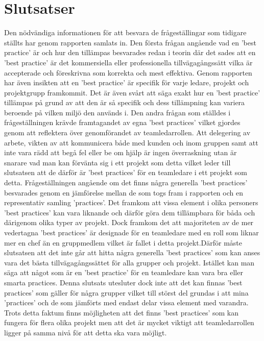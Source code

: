 \section{Slutsatser}
Den nödvändiga informationen för att besvara de frågeställingar som tidigare ställts har genom rapporten samlats in. Den första frågan angående vad en 'best practice' är och hur den tillämpas besvarades redan i teorin där det sades att en 'best practice' är det kommersiella eller professionella tillvägagångssätt vilka är accepterade och föreskrivna som korrekta och mest effektiva. Genom rapporten har även insikten att en 'best practice' är specifik för varje ledare, projekt och projektgrupp framkommit. Det är även svårt att säga exakt hur en 'best practice' tillämpas på grund av att den är så specifik och dess tillämpning kan variera beroende på vilken miljö den används i. 
\newline \newline 
Den andra frågan som ställdes i frågeställningen krävde framtagandet av egna 'best practices' vilket gjordes genom att reflektera över genomförandet av teamledarrollen. Att delegering av arbete, vikten av att kommunicera både med kunden och inom gruppen samt att inte vara rädd att begå fel eller be om hjälp är ingen överraskning utan är snarare vad man kan förvänta sig i ett projekt som detta vilket leder till slutsatsen att de därför är 'best practices' för en teamledare i ett projekt som detta.
\newline \newline
Frågeställningen angående om det finns några generella 'best practices' besvarades genom en jämförelse mellan de som togs fram i rapporten och en representativ samling 'practices'. Det framkom att vissa element i olika personers 'best practices' kan vara liknande och därför göra dem tillämpbara för båda och därigenom olika typer av projekt. Dock framkom det att majoriteten av de mer vedertagna 'best practices' är designade för en teamledare med en roll som liknar mer en chef än en gruppmedlem vilket är fallet i detta projekt.Därför måste slutsatsen att det inte går att hitta några generella 'best practices' som kan anses vara det bästa tillvägagångssättet för alla grupper och projekt. Istället kan man säga att något som är en 'best practice' för en teamledare kan vara bra eller smarta practices. Denna slutsats utesluter dock inte att det kan finnas 'best practices' som gäller för några grupper vilket till störst del grundas i att mina 'practices' och de som jämförts med endast delar vissa element med varandra. Trots detta faktum finns möjligheten att det finns 'best practices' som kan fungera för flera olika projekt men att det är mycket viktigt att teamledarrollen ligger på samma nivå för att detta ska vara möjligt.